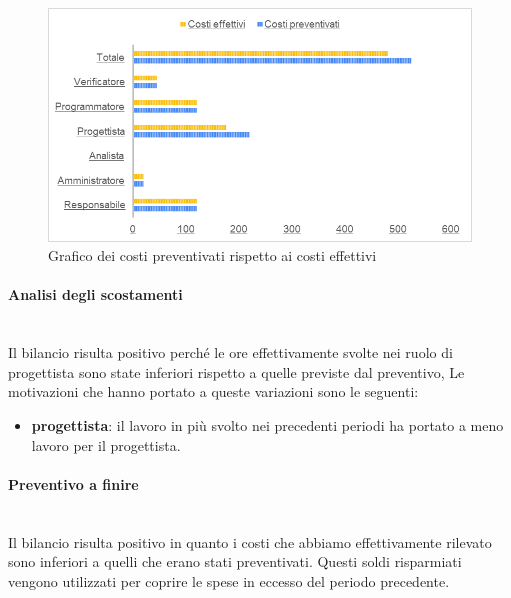 \begin{figure} [H]
	\includegraphics[width=\linewidth]{./img/Grafici/42.png}
	\caption{Grafico dei costi preventivati rispetto ai costi effettivi}
\end{figure}

\paragraph*{Analisi degli scostamenti} \mbox{} \\
Il bilancio risulta positivo perché le ore effettivamente svolte nei ruolo di progettista sono state inferiori rispetto a quelle previste dal preventivo,
Le motivazioni che hanno portato a queste variazioni sono le seguenti:
\begin{itemize}
	\item \textbf{progettista}: il lavoro in più svolto nei precedenti periodi ha portato a meno lavoro per il progettista.
\end{itemize}
\paragraph*{Preventivo a finire} \mbox{} \\
Il bilancio risulta positivo in quanto i costi che abbiamo effettivamente rilevato sono inferiori a quelli che erano stati preventivati. Questi soldi risparmiati vengono utilizzati per coprire le spese in eccesso del periodo precedente.


